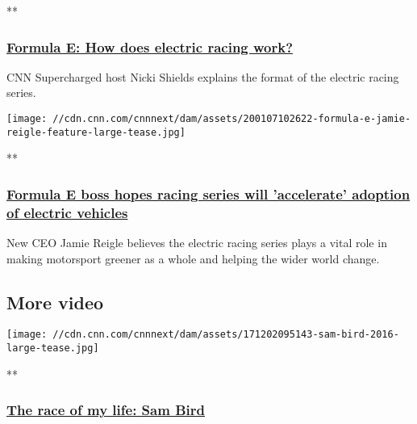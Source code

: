 **

\hypertarget{formula-e-how-does-electric-racing-work}{%
\subsubsection{\texorpdfstring{\href{/videos/sports/2020/01/10/formula-e-explainer-season-2019-2020-vision-spt-intl.cnn}{Formula
E: How does electric racing
work?}}{Formula E: How does electric racing work?}}\label{formula-e-how-does-electric-racing-work}}

CNN Supercharged host Nicki Shields explains the format of the electric
racing series.

\href{/videos/sports/2020/01/06/formulae-ceo-jamie-reigle-racing-electric-vehicle-spt-intl.cnn}{}

\texttt{[image: //cdn.cnn.com/cnnnext/dam/assets/200107102622-formula-e-jamie-reigle-feature-large-tease.jpg]}

**

\hypertarget{formula-e-boss-hopes-racing-series-will-accelerate-adoption-of-electric-vehicles}{%
\subsubsection{\texorpdfstring{\href{/videos/sports/2020/01/06/formulae-ceo-jamie-reigle-racing-electric-vehicle-spt-intl.cnn}{Formula
E boss hopes racing series will 'accelerate' adoption of electric
vehicles}}{Formula E boss hopes racing series will 'accelerate' adoption of electric vehicles}}\label{formula-e-boss-hopes-racing-series-will-accelerate-adoption-of-electric-vehicles}}

New CEO Jamie Reigle believes the electric racing series plays a vital
role in making motorsport greener as a whole and helping the wider world
change.

\hypertarget{more-video-}{%
\subsection{More video~}\label{more-video-}}

\href{/videos/sports/2020/02/13/sam-bird-race-of-my-life-2016-buenos-aires-eprix-formula-e-supercharged-vision-spt-intl-lon-orig.cnn}{}

\texttt{[image: //cdn.cnn.com/cnnnext/dam/assets/171202095143-sam-bird-2016-large-tease.jpg]}

**

\hypertarget{the-race-of-my-life-sam-bird}{%
\subsubsection{\texorpdfstring{\href{/videos/sports/2020/02/13/sam-bird-race-of-my-life-2016-buenos-aires-eprix-formula-e-supercharged-vision-spt-intl-lon-orig.cnn}{The
race of my life: Sam
Bird}}{The race of my life: Sam Bird}}\label{the-race-of-my-life-sam-bird}}

